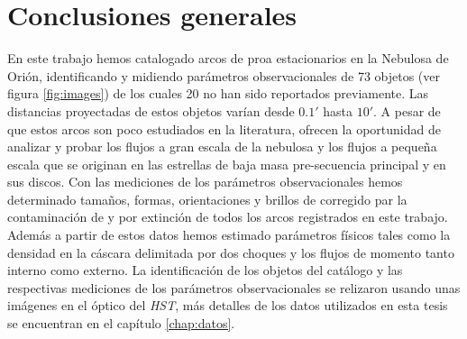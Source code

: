 %


%

\label{chap:conclu}

\section{Conclusiones generales}
\label{sec:con-g}

En este trabajo hemos catalogado arcos de proa estacionarios en la Nebulosa de Orión, identificando y  midiendo  parámetros observacionales de 73 objetos (ver figura \ref{fig:images}) de los cuales 20 no han sido reportados previamente. Las distancias proyectadas de estos objetos varían desde \(0.1'\) hasta \(10'\). A pesar de que estos arcos son poco estudiados en la literatura, ofrecen la oportunidad de analizar y probar los flujos a gran escala de la nebulosa y los flujos a pequeña escala que se originan en las estrellas de baja masa pre-secuencia principal y en sus discos. Con las mediciones de los parámetros observacionales hemos determinado tamaños, formas, orientaciones y brillos de \ha{} corregido par la contaminación de \nii{} y por extinción de todos los arcos registrados en este trabajo. Además a partir de estos datos hemos estimado parámetros físicos tales como la  densidad en la cáscara  delimitada por dos choques y los flujos de momento tanto interno como externo. La identificación de los objetos del catálogo y las respectivas mediciones de los parámetros observacionales se relizaron usando unas imágenes en el óptico del \textit{HST}, más detalles de los datos utilizados en esta tesis se encuentran en el capítulo \ref{chap:datos}.\\  

